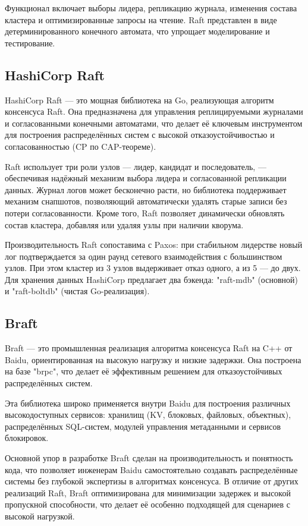 Функционал включает выборы лидера, репликацию журнала, изменения состава кластера и
оптимизированные запросы на чтение. Raft представлен в виде детерминированного
конечного автомата, что упрощает моделирование и тестирование.

\subsection{HashiCorp Raft}

HashiCorp Raft \cite{hashicorpraft} — это мощная библиотека на Go, реализующая алгоритм консенсуса Raft. Она
предназначена для управления реплицируемыми журналами и согласованными конечными
автоматами, что делает её ключевым инструментом для построения распределённых систем с
высокой отказоустойчивостью и согласованностью (CP по CAP-теореме).

Raft использует три роли узлов — лидер, кандидат и последователь, — обеспечивая надёжный
механизм выбора лидера и согласованной репликации данных. Журнал логов может бесконечно
расти, но библиотека поддерживает механизм снапшотов, позволяющий автоматически удалять
старые записи без потери согласованности. Кроме того, Raft позволяет динамически
обновлять состав кластера, добавляя или удаляя узлы при наличии кворума.

Производительность Raft сопоставима с Paxos: при стабильном лидерстве новый лог
подтверждается за один раунд сетевого взаимодействия с большинством узлов. При этом
кластер из 3 узлов выдерживает отказ одного, а из 5 — до двух. Для хранения данных
HashiCorp предлагает два бэкенда: "raft-mdb" (основной) и "raft-boltdb" (чистая
Go-реализация).

\subsection{Braft}

Braft \cite{braft} — это промышленная реализация алгоритма консенсуса Raft на C++ от Baidu,
ориентированная на высокую нагрузку и низкие задержки. Она построена на базе "brpc",
что делает её эффективным решением для отказоустойчивых распределённых систем.  

Эта библиотека широко применяется внутри Baidu для построения различных высокодоступных
сервисов: хранилищ (KV, блоковых, файловых, объектных), распределённых SQL-систем,
модулей управления метаданными и сервисов блокировок.  

Основной упор в разработке Braft сделан на производительность и понятность кода, что
позволяет инженерам Baidu самостоятельно создавать распределённые системы без глубокой
экспертизы в алгоритмах консенсуса. В отличие от других реализаций Raft, Braft
оптимизирована для минимизации задержек и высокой пропускной способности, что делает
её особенно подходящей для сценариев с высокой нагрузкой.  

